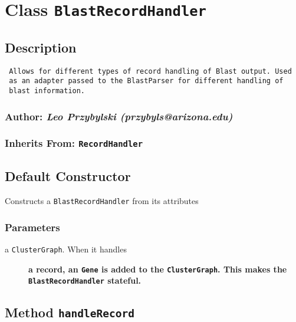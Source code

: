 
\section{Class \texttt{BlastRecordHandler}\label{Class_BlastRecordHandler}}
\subsection*{Description\label{Description}}
\begin{verbatim}
 Allows for different types of record handling of Blast output. Used
 as an adapter passed to the BlastParser for different handling of 
 blast information.
\end{verbatim}
\subsubsection*{Author: \textit{Leo Przybylski (przybyls@arizona.edu)}\label{Author:_Leo_Przybylski_przybyls_arizona_edu_}}
\subsubsection*{Inherits From: \texttt{RecordHandler}\label{Inherits_From:_RecordHandler}}
\subsection*{Default Constructor\label{Default_Constructor}}


Constructs a \texttt{BlastRecordHandler} from its attributes

\subsubsection*{Parameters\label{Parameters}}
\begin{description}

\item[{a \texttt{ClusterGraph}. When it handles}] \textbf{a record, an \texttt{Gene} is added to the \texttt{ClusterGraph}. This makes the \texttt{BlastRecordHandler} stateful.}\end{description}
\subsection*{Method \texttt{handleRecord}\label{Method_handleRecord}}


